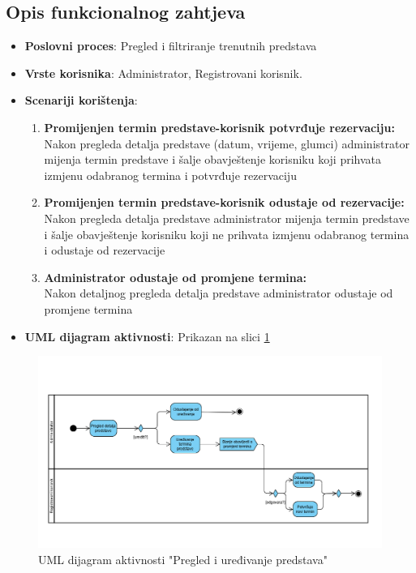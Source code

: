 \subsection{Opis funkcionalnog zahtjeva}  
\begin{itemize}  
    \item \textbf{Poslovni proces}: Pregled i filtriranje trenutnih predstava  
    \item \textbf{Vrste korisnika}: Administrator, Registrovani korisnik.  
    \item \textbf{Scenariji korištenja}:  
        \begin{enumerate}  
            \item \textbf{Promijenjen termin predstave-korisnik potvrđuje rezervaciju:} \\
            Nakon pregleda detalja predstave (datum, vrijeme, glumci) administrator mijenja termin predstave i šalje obavještenje korisniku koji prihvata izmjenu odabranog termina i potvrđuje rezervaciju  
            
            \item \textbf{Promijenjen termin predstave-korisnik odustaje od rezervacije:} \\
            Nakon pregleda detalja predstave administrator mijenja termin predstave i šalje obavještenje korisniku koji ne prihvata izmjenu odabranog termina i odustaje od rezervacije
  
            \item \textbf{Administrator odustaje od promjene termina:} \\
            Nakon detaljnog pregleda detalja predstave administrator odustaje od promjene termina  
        \end{enumerate}
    \item \textbf{UML dijagram aktivnosti}: Prikazan na slici \ref{fig:fz1} 
\end{itemize}   
\begin{figure}[H]
    \centering
    \includegraphics[width=1\textwidth]{Slike/Fz1.png}
    \caption{UML dijagram aktivnosti "Pregled i uređivanje predstava"}
    \label{fig:fz1}
\end{figure}

